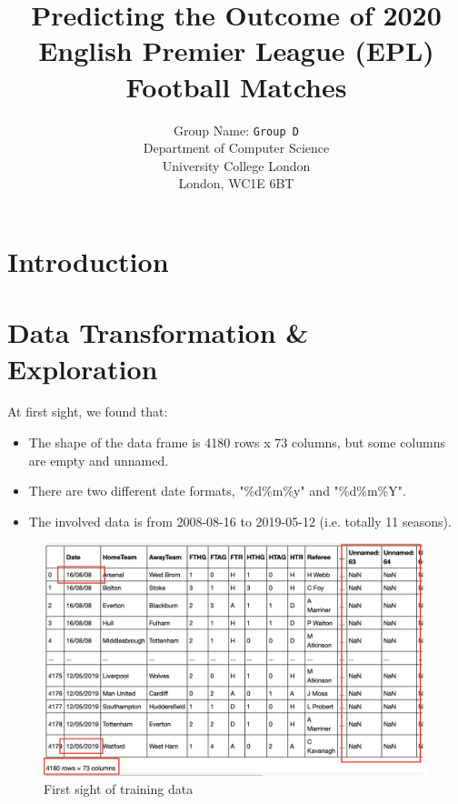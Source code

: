 \documentclass{article}
\title{Predicting the Outcome of 2020 English Premier League (EPL) Football Matches}
\author{
 Group Name: \texttt{Group D}\\
  Department of Computer Science\\
  University College London\\
  London, WC1E 6BT\\
}
\begin{document}
\maketitle
{}


\section{Introduction }


\section{Data Transformation \& Exploration}

At first sight, we found that:
\begin{itemize}
\item The shape of the data frame is 4180 rows x 73 columns, but some columns are empty and unnamed.
\item There are two different date formats, "\%d\/\%m\/\%y" and "\%d\/\%m\/\%Y".
\item The involved data is from 2008-08-16 to 2019-05-12 (i.e. totally 11 seasons).
\end{itemize}

\begin{figure}[ht]
\centering
\includegraphics[scale=0.4]{graphs/firstSight.png}
\caption{ First sight of training data}
\label{fig:firstSight}
\end{figure}

\end{document}
